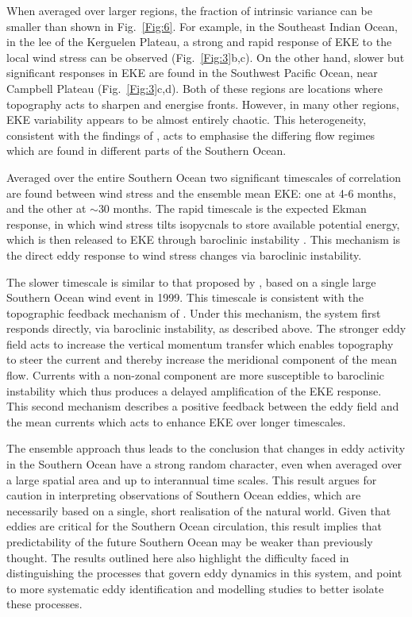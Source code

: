 \documentclass[linenumbers]{agujournal2019}
\begin{document}
When averaged over larger regions, the fraction of intrinsic variance can be smaller than shown in Fig.~\ref{Fig:6}.
For example, in the Southeast Indian Ocean, in the lee of the Kerguelen Plateau, a strong and rapid response of EKE to the local wind stress can be observed (Fig.~\ref{Fig:3}b,c).
On the other hand, slower but significant responses in EKE are found in the Southwest Pacific Ocean, near Campbell Plateau (Fig.~\ref{Fig:3}c,d).
Both of these regions are locations where topography acts to sharpen and energise fronts.
However, in many other regions, EKE variability appears to be almost entirely chaotic.
This heterogeneity, consistent with the findings of \citet{Patara2016}, acts to emphasise the differing flow regimes which are found in different parts of the Southern Ocean.

Averaged over the entire Southern Ocean two significant timescales of correlation are found between wind stress and the ensemble mean EKE: one at 4-6 months, and the other at $\sim$30 months.
The rapid timescale is the expected Ekman response, in which wind stress tilts isopycnals to store available potential energy, which is then released to EKE through baroclinic instability \citep[e.g.][]{Sinha2016}.
This mechanism is the direct eddy response to wind stress changes via baroclinic instability.

The slower timescale is similar to that proposed by \citet{Meredith-Hogg-2006}, based on a single large Southern Ocean wind event in 1999.
This timescale is consistent with the  topographic feedback mechanism of \citet{Hogg-Blundell-2006}.
Under this mechanism, the system first responds directly, via baroclinic instability, as described above. 
The stronger eddy field acts to increase the vertical momentum transfer which enables topography to steer the current and thereby increase the meridional component of the mean flow. 
Currents with a non-zonal component are more susceptible to baroclinic instability \citep[e.g.][]{Arbic2004} which thus produces a delayed amplification of the EKE response.
This second mechanism describes a positive feedback between the eddy field and the mean currents which acts to enhance EKE over longer timescales.
 
The ensemble approach thus leads to the conclusion that changes in eddy activity in the Southern Ocean have a strong random character, even when averaged over a large spatial area and up to interannual time scales.
This result argues for caution in interpreting observations of Southern Ocean eddies, which are necessarily based on a single, short realisation of the natural world.
Given that eddies are critical for the Southern Ocean circulation, this result implies that predictability of the future Southern Ocean may be weaker than previously thought.
The results outlined here also highlight the difficulty faced in distinguishing the processes that govern eddy dynamics in this system, and point to more systematic eddy identification and modelling studies to better isolate these processes.
\end{document}
